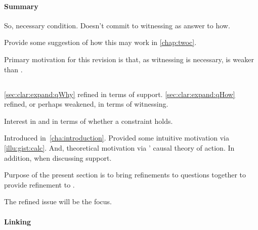 \paragraph{Summary}

\begin{note}
  So, necessary condition.
  Doesn't commit to witnessing as answer to how.

  Provide some suggestion of how this may work in \autoref{chap:twoc}.

  Primary motivation for this revision is that, as witnessing is necessary, \qHowV{} is weaker than \qHow{}.
\end{note}

\subsection{\issueInclusion{}}
\label{sec:clar:expand:issue}

\begin{note}
  \autoref{sec:clar:expand:qWhy} refined \qWhy{} in terms of support.
  \autoref{sec:clar:expand:qHow} refined, or perhaps weakened, \qHow{} in terms of witnessing.

  Interest in \qWhy{} and \qHow{} in terms of whether a constraint holds.

  \begin{quote}
    \vspace{-\baselineskip}
    \issueInclusionFirst*
  \end{quote}

  Introduced in~\autoref{cha:introduction}.
  Provided some intuitive motivation via \autoref{illu:gist:calc}.
  And, theoretical motivation via \citeauthor{Davidson:1963aa}' causal theory of action.
  In addition, \citeauthor{Boghossian:2014aa} when discussing support.

  Purpose of the present section is to bring refinements to questions together to provide refinement to \issueInclusion{}.

  The refined issue will be the focus.
\end{note}

\paragraph{Linking}

